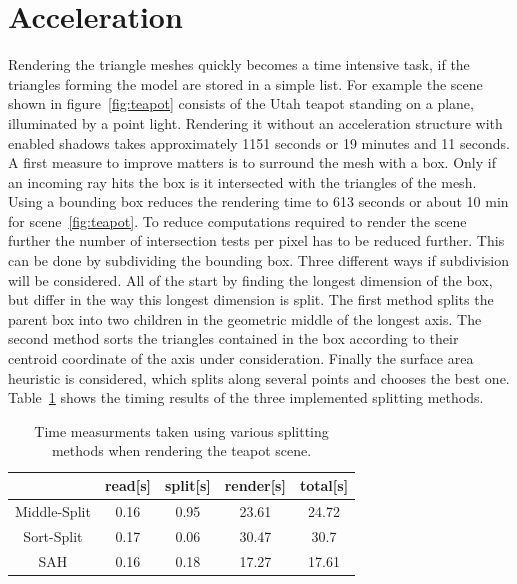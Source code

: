 \section{Acceleration}
Rendering the triangle meshes quickly becomes a time intensive task, if the triangles forming the model are stored in a simple list. For example the scene shown in figure~\ref{fig:teapot} consists of the Utah teapot standing on a plane, illuminated by a point light. Rendering it without an acceleration structure with enabled shadows takes approximately 1151 seconds or 19 minutes and 11 seconds. A first measure to improve matters is to surround the mesh with a box. Only if an incoming ray hits the box is it intersected with the triangles of the mesh. Using a bounding box reduces the rendering time to 613 seconds or about 10 min for scene~\ref{fig:teapot}. To reduce computations required to render the scene further the number of intersection tests per pixel has to be reduced further. This can be done by subdividing the bounding box. Three different ways if subdivision will be considered. All of the start by finding the longest dimension of the box, but differ in the way this longest dimension is split. The first method splits the parent box into two children in the geometric middle of the longest axis. The second method sorts the triangles contained in the box according to their centroid coordinate of the axis under consideration. Finally the surface area heuristic is considered, which splits along several points and chooses the best one. Table~\ref{tab:teapodTiming} shows the timing results of the three implemented splitting methods.

\begin{table}
\centering
\begin{tabular}{|c|c|c|c|c|} \hline
				& read[s] & split[s] & render[s] & total[s] \\ \hline
Middle-Split    & 0.16 & 0.95  & 23.61  & 24.72	\\
Sort-Split      & 0.17 & 0.06  & 30.47  & 30.7	\\
SAH             & 0.16 & 0.18  & 17.27  & 17.61	\\ \hline
\end{tabular}
\caption{Time measurments taken using various splitting methods when rendering the teapot scene.}
\label{tab:teapodTiming}
\end{table}

